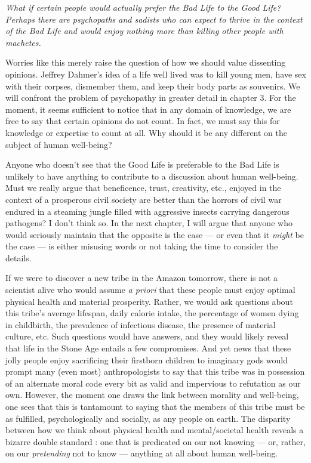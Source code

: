 \documentclass[a4paper,14pt]{extbook}
\begin{document}
\textit{What if certain people would actually prefer the Bad Life to the Good Life?
      Perhaps there are psychopaths and sadists who can expect to thrive in the context of the Bad Life and would enjoy nothing more than killing other people with machetes.}

Worries like this merely raise the question of how we should value dissenting opinions.
Jeffrey Dahmer's idea of a life well lived was to kill young men, have sex with their corpses, dismember them, and keep their body parts as souvenirs.
We will confront the problem of psychopathy in greater detail in chapter 3.
For the moment, it seems sufficient to notice that in any domain of knowledge, we are free to say that certain opinions do not count.
In fact, we must say this for knowledge or expertise to count at all.
Why should it be any different on the subject of human well-being?

Anyone who doesn't see that the Good Life is preferable to the Bad Life is unlikely to have anything to contribute to a discussion about human well-being.
Must we really argue that beneficence, trust, creativity, etc., enjoyed in the context of a prosperous civil society are better than the horrors of civil war endured in a steaming jungle filled with aggressive insects carrying dangerous pathogens?
I don't think so.
In the next chapter, I will argue that anyone who would seriously maintain that the opposite is the case --- or even that it \textit{might} be the case --- is either misusing words or not taking the time to consider the details.

If we were to discover a new tribe in the Amazon tomorrow, there is not a scientist alive who would assume \textit{a priori} that these people must enjoy optimal physical health and material prosperity.
Rather, we would ask questions about this tribe's average lifespan, daily calorie intake, the percentage of women dying in childbirth, the prevalence of infectious disease, the presence of material culture, etc.
Such questions would have answers, and they would likely reveal that life in the Stone Age entails a few compromises.
And yet news that these jolly people enjoy sacrificing their firstborn children to imaginary gods would prompt many (even most) anthropologists to say that this tribe was in possession of an alternate moral code every bit as valid and impervious to refutation as our own.
However, the moment one draws the link between morality and well-being, one sees that this is tantamount to saying that the members of this tribe must be as fulfilled, psychologically and socially, as any people on earth.
The disparity between how we think about physical health and mental/societal health reveals a bizarre double standard :
one that is predicated on our not knowing --- or, rather, on our \textit{pretending} not to know --- anything at all about human well-being.
\end{document}
